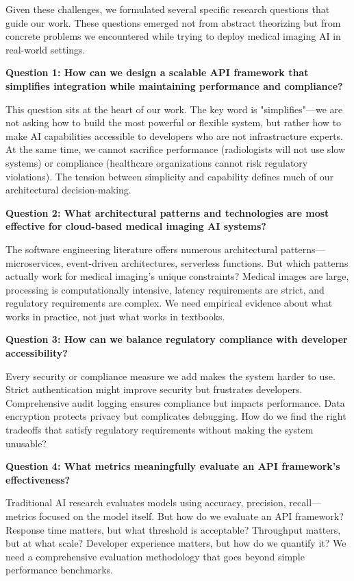 \documentclass[12pt,a4paper]{article}
\begin{document}
Given these challenges, we formulated several specific research questions that guide our work. These questions emerged not from abstract theorizing but from concrete problems we encountered while trying to deploy medical imaging AI in real-world settings.

\textbf{Question 1: How can we design a scalable API framework that simplifies integration while maintaining performance and compliance?}

This question sits at the heart of our work. The key word is "simplifies"—we are not asking how to build the most powerful or flexible system, but rather how to make AI capabilities accessible to developers who are not infrastructure experts. At the same time, we cannot sacrifice performance (radiologists will not use slow systems) or compliance (healthcare organizations cannot risk regulatory violations). The tension between simplicity and capability defines much of our architectural decision-making.

\textbf{Question 2: What architectural patterns and technologies are most effective for cloud-based medical imaging AI systems?}

The software engineering literature offers numerous architectural patterns—microservices, event-driven architectures, serverless functions. But which patterns actually work for medical imaging's unique constraints? Medical images are large, processing is computationally intensive, latency requirements are strict, and regulatory requirements are complex. We need empirical evidence about what works in practice, not just what works in textbooks.

\textbf{Question 3: How can we balance regulatory compliance with developer accessibility?}

Every security or compliance measure we add makes the system harder to use. Strict authentication might improve security but frustrates developers. Comprehensive audit logging ensures compliance but impacts performance. Data encryption protects privacy but complicates debugging. How do we find the right tradeoffs that satisfy regulatory requirements without making the system unusable?

\textbf{Question 4: What metrics meaningfully evaluate an API framework's effectiveness?}

Traditional AI research evaluates models using accuracy, precision, recall—metrics focused on the model itself. But how do we evaluate an API framework? Response time matters, but what threshold is acceptable? Throughput matters, but at what scale? Developer experience matters, but how do we quantify it? We need a comprehensive evaluation methodology that goes beyond simple performance benchmarks.
\end{document}
